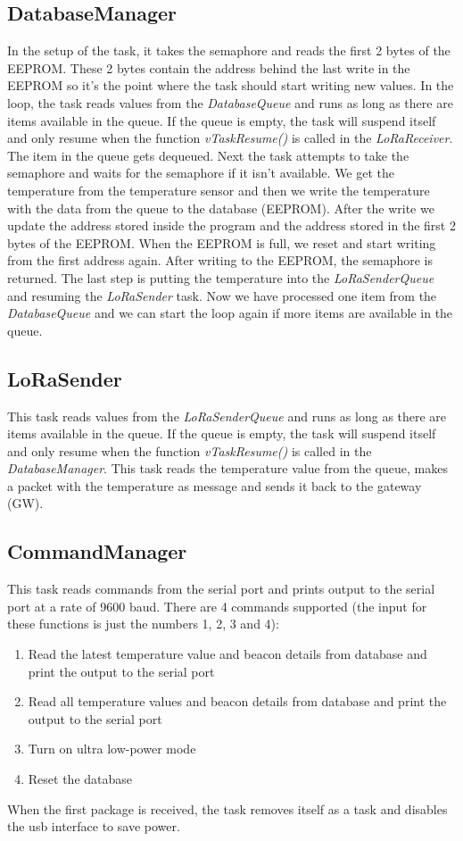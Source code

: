 \documentclass{scrartcl}
\begin{document}
\subsection{DatabaseManager}
In the setup of the task, it takes the semaphore and reads the first 2 bytes of the EEPROM.
These 2 bytes contain the address behind the last write in the EEPROM so it's the point where the task
should start writing new values.
In the loop, the task reads values from the \textit{DatabaseQueue} and runs as long as there are items available in the queue.
If the queue is empty, the task will suspend itself and only resume when the function \textit{vTaskResume()} is called in the \textit{LoRaReceiver}.
The item in the queue gets dequeued. Next the task attempts to take the semaphore and waits for the semaphore if it isn't available.
We get the temperature from the temperature sensor and then we write the temperature with the data from the queue to the database (EEPROM).
After the write we update the address stored inside the program and the address stored in the first 2 bytes of the EEPROM.
When the EEPROM is full, we reset and start writing from the first address again. After writing to the EEPROM, the semaphore is returned.
The last step is putting the temperature into the \textit{LoRaSenderQueue} and resuming the \textit{LoRaSender} task.
Now we have processed one item from the \textit{DatabaseQueue} and we can start the loop again if more items are available in the queue.

\newpage

\subsection{LoRaSender}
This task reads values from the \textit{LoRaSenderQueue} and runs as long as there are items available in the queue.
If the queue is empty, the task will suspend itself and only resume when the function \textit{vTaskResume()} is called in the \textit{DatabaseManager}.
This task reads the temperature value from the queue, makes a packet with the temperature as message and sends it back to the gateway (GW).

\subsection{CommandManager}
This task reads commands from the serial port and prints output to the serial port at a rate of 9600 baud.
There are 4 commands supported (the input for these functions is just the numbers 1, 2, 3 and 4):
\begin{enumerate}
    \item Read the latest temperature value and beacon details from database and print the output to the serial port
    \item Read all temperature values and beacon details from database and print the output to the serial port
    \item Turn on ultra low-power mode
    \item Reset the database
\end{enumerate}
When the first package is received, the task removes itself as a task and disables the usb interface to save power.
\end{document}
